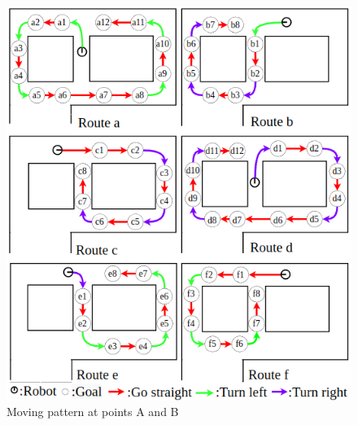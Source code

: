 \begin{figure}[hbtp]
  \centering
 \includegraphics[keepaspectratio, scale=0.6]
      {images/route.png}
 \caption{Moving pattern at points A and B}
 \label{Fig:route}
\end{figure}

\newpage
